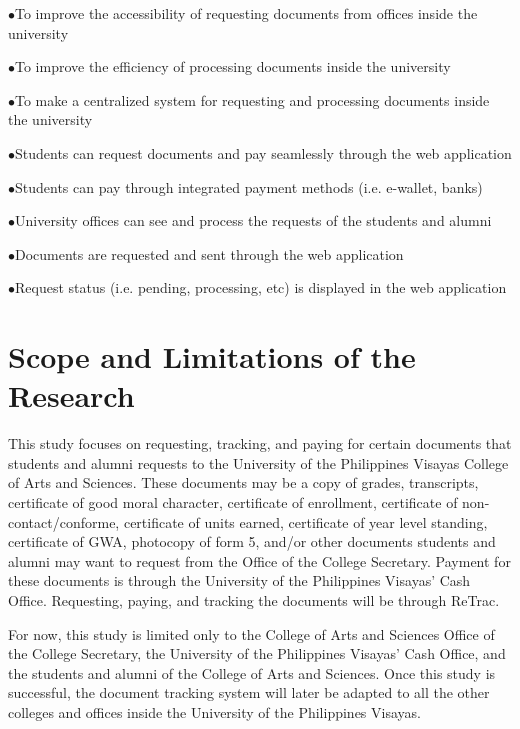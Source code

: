 \begin{description}
    \item $\bullet$To improve the accessibility of requesting documents from offices inside the university
    \item $\bullet$To improve the efficiency of processing documents inside the university
    \item $\bullet$To make a centralized system for requesting and processing documents inside the university
    \begin{description}
        \item $\bullet$Students can request documents and pay seamlessly through the web application
        \item $\bullet$Students can pay through integrated payment methods (i.e. e-wallet, banks)
        \item $\bullet$University offices can see and process the requests of the students and alumni
        \item $\bullet$Documents are requested and sent through the web application
        \item $\bullet$Request status (i.e. pending, processing, etc) is displayed in the web application

    \end{description}
    
\end{description}


\section{Scope and Limitations of the Research}
\label{sec:scopelimitations}

This study focuses on requesting, tracking, and paying for certain documents that students and alumni requests to the University of the Philippines Visayas College of Arts and Sciences. These documents may be a copy of grades, transcripts, certificate of good moral character, certificate of enrollment, certificate of non-contact/conforme, certificate of units earned, certificate of year level standing, certificate of GWA, photocopy of form 5, and/or other documents students and alumni may want to request from the Office of the College Secretary. Payment for these documents is through the University of the Philippines Visayas’ Cash Office. Requesting, paying, and tracking the documents will be through ReTrac.

For now, this study is limited only to the College of Arts and Sciences Office of the College Secretary, the University of the Philippines Visayas’ Cash Office, and the students and alumni of the College of Arts and Sciences. Once this study is successful, the document tracking system will later be adapted to all the other colleges and offices inside the University of the Philippines Visayas. 



